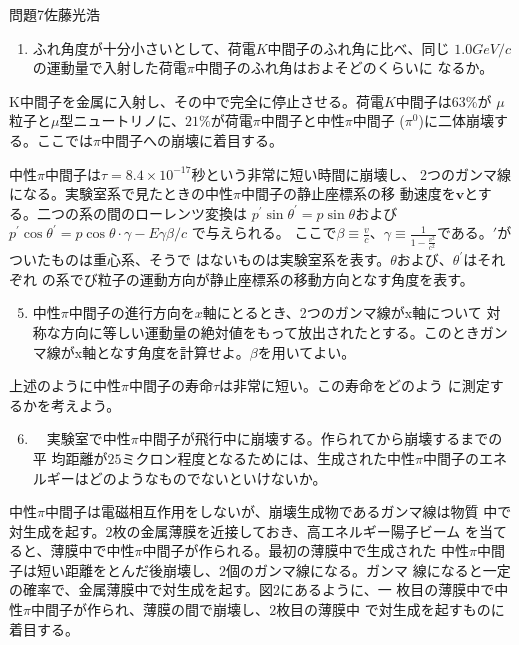 \documentclass[fleqn]{jbook}
\begin{document}
\begin{question}{問題7}{佐藤光浩}
\begin{enumerate}
\item
ふれ角度が十分小さいとして、荷電$K$中間子のふれ角に比べ、同じ
$1.0GeV/c$の運動量で入射した荷電$\pi$中間子のふれ角はおよそどのくらいに
なるか。
\end{enumerate}

K中間子を金属に入射し、その中で完全に停止させる。荷電$K$中間子は$63\%$が
$\mu$粒子と$\mu$型ニュートリノに、$21\%$が荷電$\pi$中間子と中性$\pi$中間子
($\pi^0$)に二体崩壊する。ここでは$\pi$中間子への崩壊に着目する。

中性$\pi$中間子は$\tau=8.4\times 10^{-17}$秒という非常に短い時間に崩壊し、
2つのガンマ線になる。実験室系で見たときの中性$\pi$中間子の静止座標系の移
動速度を$\mathbf{v}$とする。二つの系の間のローレンツ変換は
$p^{\prime}\sin \theta^{\prime} = p\sin \theta$および$p^{\prime} \cos
\theta^{\prime}=p\cos \theta \cdot \gamma -E\gamma\beta/c$ で与えられる。
ここで$\beta \equiv \frac{v}{c}$、$\gamma \equiv
\frac{1}{1-\frac{v^2}{c^2}}$である。$\prime$がついたものは重心系、そうで
はないものは実験室系を表す。$\theta$および、$\theta^{\prime}$はそれぞれ
の系でび粒子の運動方向が静止座標系の移動方向となす角度を表す。

\begin{enumerate}\setcounter{enumi}{4}
\item
 中性$\pi$中間子の進行方向を$x$軸にとるとき、2つのガンマ線がx軸について
対称な方向に等しい運動量の絶対値をもって放出されたとする。このときガン
マ線がx軸となす角度を計算せよ。$\beta$を用いてよい。
\end{enumerate}

上述のように中性$\pi$中間子の寿命$\tau$は非常に短い。この寿命をどのよう
に測定するかを考えよう。

\begin{enumerate}\setcounter{enumi}{5}
\item
　実験室で中性$\pi$中間子が飛行中に崩壊する。作られてから崩壊するまでの平
均距離が$25$ミクロン程度となるためには、生成された中性$\pi$中間子のエネ
ルギーはどのようなものでないといけないか。
\end{enumerate}

中性$\pi$中間子は電磁相互作用をしないが、崩壊生成物であるガンマ線は物質
中で対生成を起す。$2$枚の金属薄膜を近接しておき、高エネルギー陽子ビーム
を当てると、薄膜中で中性$\pi$中間子が作られる。最初の薄膜中で生成された
中性$\pi$中間子は短い距離をとんだ後崩壊し、$2$個のガンマ線になる。ガンマ
線になると一定の確率で、金属薄膜中で対生成を起す。図$2$にあるように、一
枚目の薄膜中で中性$\pi$中間子が作られ、薄膜の間で崩壊し、$2$枚目の薄膜中
で対生成を起すものに着目する。


\end{question}
\end{document}
